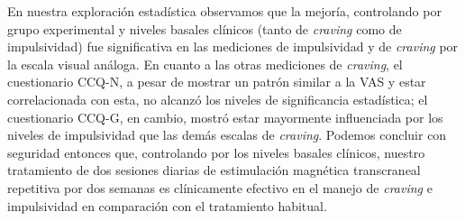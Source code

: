 En nuestra exploración estadística observamos que la mejoría, controlando por grupo experimental y niveles basales clínicos (tanto de \textit{craving} como de impulsividad) fue significativa en las mediciones de impulsividad y de \textit{craving} por la escala visual análoga. En cuanto a las otras mediciones de \textit{craving}, el cuestionario  CCQ-N, a pesar de mostrar un patrón similar a la VAS y estar correlacionada con esta, no alcanzó los niveles de significancia estadística; el cuestionario CCQ-G, en cambio, mostró estar mayormente influenciada por los niveles de impulsividad que las demás escalas de \textit{craving}.
Podemos concluir con seguridad entonces que, controlando por los niveles basales clínicos, nuestro tratamiento de dos sesiones diarias de estimulación magnética transcraneal repetitiva por dos semanas es clínicamente efectivo en el manejo de \textit{craving} e impulsividad en comparación con el tratamiento habitual.

